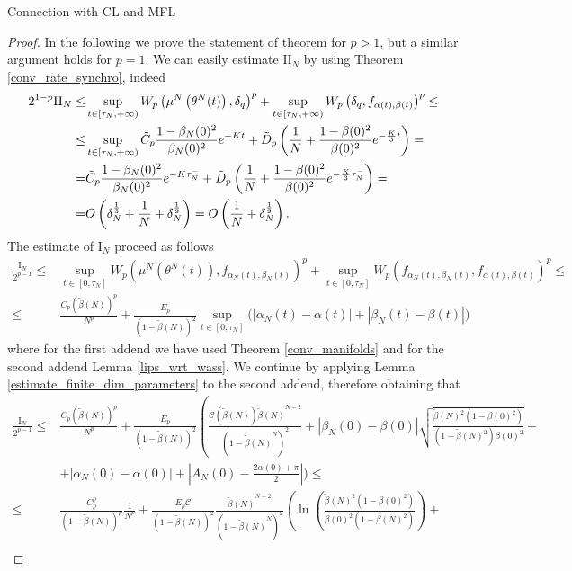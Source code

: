 \documentclass{article}
\theoremstyle{definition}
\begin{document}
\begin{section}{Connection with CL and MFL}
\begin{proof}
    In the following we prove the statement of theorem for $p>1$, but a similar argument holds for $p=1$. We can easily estimate $\mathrm{II}_N$ by using Theorem \ref{conv_rate_synchro}, indeed 
     \begin{align*}
2^{1-p}\mathrm{II}_N\leq&\sup_{t\in[\tau_N,+\infty)}W_p\left(\mu^N\left(\theta^N(t)\right),\delta_q\right)^p+\sup_{t\in[\tau_N,+\infty)}W_p\left(\delta_q,f_{\alpha(t),\beta(t)}\right)^p\leq\\
\leq&\sup_{t\in[\tau_N,+\infty)}\Tilde{C}_p\frac{1-\beta_N(0)^2}{\beta_N(0)^2}e^{-Kt}+\Tilde{D}_p\left(\frac{1}{N}+\frac{1-\beta(0)^2}{\beta(0)^2}e^{-\frac{K}{3}t}\right)=\\
=&\Tilde{C}_p\frac{1-\beta_N(0)^2}{\beta_N(0)^2}e^{-K\tau_N^-}+\Tilde{D}_p\left(\frac{1}{N}+\frac{1-\beta(0)^2}{\beta(0)^2}e^{-\frac{K}{3}\tau_N^-}\right)=\\
=&O\left(\delta_N^{\frac{1}{3}}+\frac{1}{N}+\delta_N^{\frac{1}{9}}\right)=O\left(\frac{1}{N}+\delta_N^{\frac{1}{9}}\right).
    \end{align*}
    The estimate of $\mathrm{I}_N$ proceed as follows
    \begin{align*}
       \frac{\mathrm{I}_N}{2^{p-1}}\leq& \sup_{t\in[0,\tau_N]}W_p\left(\mu^N\left(\theta^N(t)\right),f_{\alpha_N(t),\beta_N(t)}\right)^p+\sup_{t\in[0,\tau_N]}W_p\left(f_{\alpha_N(t),\beta_N(t)},f_{\alpha(t),\beta(t)}\right)^p\leq\\
       \leq&\frac{C_p(\tilde{\beta}(N))^p}{N^p}+\frac{E_p}{(1-\tilde{\beta}(N))^2}\sup_{t\in[0,\tau_N]}\bigg(|\alpha_N(t)-\alpha(t)|+|\beta_N(t)-\beta(t)|\bigg)
    \end{align*}
    where for the first addend we have used Theorem \ref{conv_manifolds} and for the second addend Lemma \ref{lips_wrt_wass}.
    We continue by applying Lemma \ref{estimate_finite_dim_parameters} to the second addend, therefore obtaining that
    \begin{align*}
        \frac{\mathrm{I}_N}{2^{p-1}}\leq&\frac{C_p(\tilde{\beta}(N))^p}{N^p}+\frac{E_p}{(1-\tilde{\beta}(N))^2}\left(\frac{\mathcal{C}(\tilde{\beta}(N)){\tilde{\beta}(N)}^{N-2}}{\left(1-{\tilde{\beta}(N)}^N\right)^2}+|\beta_N(0)-\beta(0)|\sqrt{\frac{\tilde{\beta}(N)^2(1-\beta(0)^2)}{(1-\tilde{\beta}(N)^2)\beta(0)^2}}+\right.\\
        &+|\alpha_N(0)-\alpha(0)|+\left|A_N(0)-\frac{2\alpha(0)+\pi}{2}\right| \biggr)\leq\\
        \leq&\frac{C_p^p}{\left(1-\tilde{\beta}(N)\right)^p}\frac{1}{N^p}+\frac{E_p\mathcal{C}}{(1-\tilde{\beta}(N))^2}\frac{{\tilde{\beta}(N)}^{N-2}}{\left(1-{\tilde{\beta}(N)}^N\right)^2}\left(\ln\left(\frac{\tilde{\beta}(N)^2(1-\beta(0)^2)}{\beta(0)^2(1-\tilde{\beta}(N)^2)}\right)+\right.\\

\end{align*}
\end{proof}
\end{section}
\end{document}
